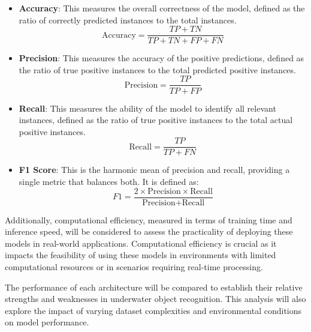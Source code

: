 \begin{itemize}
    \item \textbf{Accuracy}: This measures the overall correctness of the model, defined as the ratio of correctly predicted instances to the total instances.
    \begin{equation}
    \text{Accuracy} = \frac{TP + TN}{TP + TN + FP + FN}
    \end{equation}

    \item \textbf{Precision}: This measures the accuracy of the positive predictions, defined as the ratio of true positive instances to the total predicted positive instances.
    \begin{equation}
    \text{Precision} = \frac{TP}{TP + FP}
    \end{equation}

    \item \textbf{Recall}: This measures the ability of the model to identify all relevant instances, defined as the ratio of true positive instances to the total actual positive instances.
    \begin{equation}
    \text{Recall} = \frac{TP}{TP + FN}
    \end{equation}

    \item \textbf{F1 Score}: This is the harmonic mean of precision and recall, providing a single metric that balances both. It is defined as:
    \begin{equation}
    F1 = \frac{2 \times \text{Precision} \times \text{Recall}}{\text{Precision} + \text{Recall}}
    \end{equation}
\end{itemize}

Additionally, computational efficiency, measured in terms of training time and inference speed, will be considered to assess the practicality of deploying these models in real-world applications. Computational efficiency is crucial as it impacts the feasibility of using these models in environments with limited computational resources or in scenarios requiring real-time processing.

The performance of each architecture will be compared to establish their relative strengths and weaknesses in underwater object recognition. This analysis will also explore the impact of varying dataset complexities and environmental conditions on model performance.


\FloatBarrier

